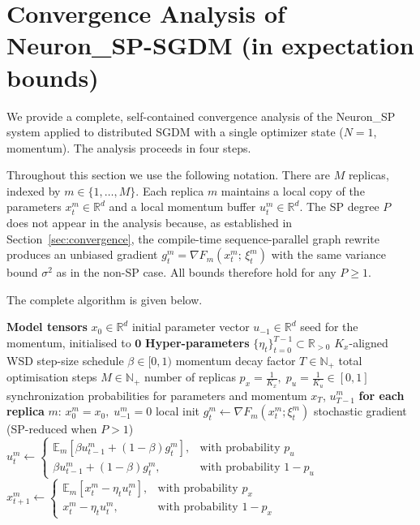 \documentclass{article}
\begin{document}
\section{Convergence Analysis of Neuron\_SP-SGDM (in expectation bounds)}
\label{sec:sgdm_proof}

We provide a complete, self-contained convergence analysis of the Neuron\_SP
system applied to distributed SGDM with a single optimizer state ($N=1$,
momentum). The analysis proceeds in four steps.

Throughout this section we use the following notation.
There are $M$ replicas, indexed by $m \in \{1, \ldots, M\}$.
Each replica $m$ maintains a local copy of the parameters $x_t^m \in \mathbb{R}^d$
and a local momentum buffer $u_t^m \in \mathbb{R}^d$.
The SP degree $P$ does not appear in the analysis because, as established in
Section~\ref{sec:convergence}, the compile-time sequence-parallel graph rewrite
produces an unbiased gradient $g_t^m = \nabla F_m(x_t^m;\,\xi_t^m)$ with the
same variance bound $\sigma^2$ as in the non-SP case. All bounds therefore hold
for any $P \geq 1$.

The complete algorithm is given below.

\begin{algorithm}[ht]
\caption{Neuron\_SP-SGDM (probabilistic synchronization formulation)}
\label{alg:desloc_sgdm}
\begin{algorithmic}[1]
\REQUIRE \textbf{Model tensors}
\STATE $x_0 \in \mathbb{R}^d$ \hfill initial parameter vector
\STATE $u_{-1} \in \mathbb{R}^d$ \hfill seed for the momentum, initialised to $\mathbf{0}$
\REQUIRE \textbf{Hyper-parameters}
\STATE $\{\eta_t\}_{t=0}^{T-1} \subset \mathbb{R}_{>0}$ \hfill $K_x$-aligned WSD step-size schedule
\STATE $\beta \in [0,1)$ \hfill momentum decay factor
\STATE $T \in \mathbb{N}_+$ \hfill total optimisation steps
\STATE $M \in \mathbb{N}_+$ \hfill number of replicas
\STATE $p_x = \frac{1}{K_x},\; p_u = \frac{1}{K_u} \in [0,1]$ \hfill synchronization probabilities for parameters and momentum
\ENSURE $x_T$, $u_{T-1}^m$
\STATE \textbf{for each replica} $m$: $x_0^m = x_0,\; u_{-1}^m = 0$ \hfill local init
        \STATE $g_t^m \leftarrow \nabla F_m(x_t^m; \xi_t^m)$ \hfill stochastic gradient (SP-reduced when $P > 1$)
        \STATE $u_t^m \leftarrow \begin{cases} \mathbb{E}_m[\beta u_{t-1}^m + (1-\beta) g_t^m], & \text{with probability } p_u \\ \beta u_{t-1}^m + (1-\beta) g_t^m, & \text{with probability } 1-p_u \end{cases}$
        \STATE $x_{t+1}^m \leftarrow \begin{cases} \mathbb{E}_m[x_t^m - \eta_t u_t^m], & \text{with probability } p_x \\ x_t^m - \eta_t u_t^m, & \text{with probability } 1-p_x \end{cases}$
    \ENDFOR
\ENDFOR
\end{algorithmic}
\end{algorithm}
\end{document}
